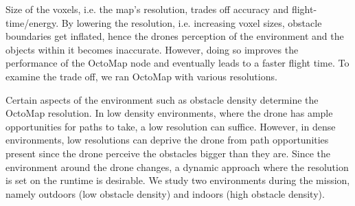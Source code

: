 Size of the voxels, i.e. the map's resolution, trades off accuracy and flight-time/energy. By lowering the resolution, i.e. increasing voxel sizes, obstacle boundaries get inflated, hence the drones perception of the environment and the objects within it becomes inaccurate. However, doing so improves the performance of the OctoMap node and eventually leads to a faster flight time. To examine the trade off, we ran OctoMap with various resolutions.
\DIFdelbegin %

\DIFdelend %
\DIFaddbegin 
\DIFaddend Certain aspects of the environment such as obstacle density determine the OctoMap resolution. In low density environments, where the drone has ample opportunities for paths to take, a low resolution can suffice. However, in dense environments, low resolutions can deprive the drone from path opportunities present since the drone perceive the obstacles bigger than they are. \DIFdelbegin %
\DIFdelend Since the environment around the drone changes, a dynamic approach where the resolution is set on the runtime is desirable. We study two environments during the mission, namely outdoors (low obstacle density) and indoors (high obstacle density). 

